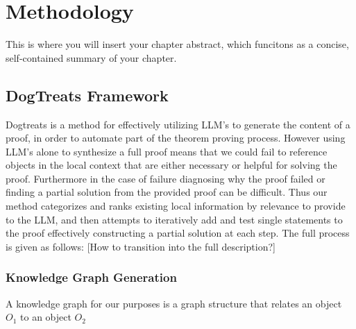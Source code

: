 \chapter{Methodology} %

\begin{chapterabstract}

This is where you will insert your chapter abstract, which funcitons as a concise, self-contained summary of your chapter.


\end{chapterabstract}



\section{DogTreats Framework}
Dogtreats is a method for effectively utilizing LLM's to generate the content of a proof, in order to automate part of the theorem proving process. However using LLM's alone to synthesize a full proof 
means that we could fail to reference objects in the local context that are either necessary or helpful for solving the proof. Furthermore in the case of failure diagnosing why the proof failed or
finding a partial solution from the provided proof can be difficult. Thus our method categorizes and ranks existing local information by relevance to provide to the LLM, and then attempts to iteratively
add and test single statements to the proof effectively constructing a partial solution at each step. The full process is given as follows: [How to transition into the full description?]

\subsection{Knowledge Graph Generation}
A knowledge graph for our purposes is a graph structure that relates an object $O_1$ to an object $O_2$ 

